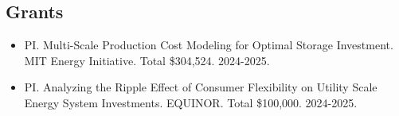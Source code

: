 \documentclass[letterpaper, 11pt]{article}
\begin{document}


\subsection*{Grants}
\begin{itemize}[itemsep=1pt, parsep=0pt,leftmargin=*]
\item PI. Multi-Scale Production Cost Modeling for Optimal Storage Investment. MIT Energy Initiative. Total \$304,524. 2024-2025.
\item PI. Analyzing the Ripple Effect of Consumer Flexibility on Utility Scale Energy System Investments. EQUINOR. Total \$100,000. 2024-2025.
\end{itemize}
\end{document}
